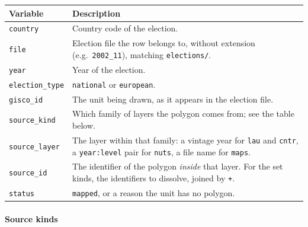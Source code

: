 \begin{longtable}{p{2.9cm}p{12.1cm}}
\toprule
\textbf{Variable} & \textbf{Description} \\
\midrule
\endhead
\texttt{country}       & Country code of the election. \\
\texttt{file}          & Election file the row belongs to, without extension
                         (e.g.\ \texttt{2002\_11}), matching
                         \texttt{elections/}. \\
\texttt{year}          & Year of the election. \\
\texttt{election\_type} & \texttt{national} or \texttt{european}. \\
\texttt{gisco\_id}     & The unit being drawn, as it appears in the election
                         file. \\
\texttt{source\_kind}  & Which family of layers the polygon comes from; see the
                         table below. \\
\texttt{source\_layer} & The layer within that family: a vintage year for
                         \texttt{lau} and \texttt{cntr}, a
                         \texttt{year:level} pair for \texttt{nuts}, a file
                         name for \texttt{maps}. \\
\texttt{source\_id}    & The identifier of the polygon \emph{inside} that
                         layer.  For the set kinds, the identifiers to dissolve,
                         joined by \texttt{+}. \\
\texttt{status}        & \texttt{mapped}, or a reason the unit has no polygon. \\
\bottomrule
\end{longtable}

\paragraph{Source kinds}\mbox{}

